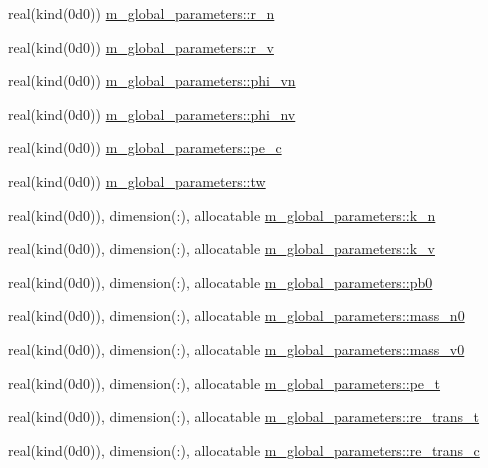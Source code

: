 \begin{Indent}
\begin{DoxyCompactItemize}
real(kind(0d0)) \hyperlink{namespacem__global__parameters_ae818e88601b1dc579a87e7c0c8cd87cb}{m\+\_\+global\+\_\+parameters\+::r\+\_\+n}
\item 
real(kind(0d0)) \hyperlink{namespacem__global__parameters_af2ee1ad578115833bb6b8e9550eb5f18}{m\+\_\+global\+\_\+parameters\+::r\+\_\+v}
\item 
real(kind(0d0)) \hyperlink{namespacem__global__parameters_acc6771df62005731bbec282b0c9a5659}{m\+\_\+global\+\_\+parameters\+::phi\+\_\+vn}
\item 
real(kind(0d0)) \hyperlink{namespacem__global__parameters_a7dbd1ec1fd1ece4e997a825fa07785eb}{m\+\_\+global\+\_\+parameters\+::phi\+\_\+nv}
\item 
real(kind(0d0)) \hyperlink{namespacem__global__parameters_ac1375e5145e018847d9025e83e58b49d}{m\+\_\+global\+\_\+parameters\+::pe\+\_\+c}
\item 
real(kind(0d0)) \hyperlink{namespacem__global__parameters_aa77b0836fe22478b69e10e656ef7fcc2}{m\+\_\+global\+\_\+parameters\+::tw}
\item 
real(kind(0d0)), dimension(\+:), allocatable \hyperlink{namespacem__global__parameters_a555eda1318a218d37d1bdd8f4d57eaf2}{m\+\_\+global\+\_\+parameters\+::k\+\_\+n}
\item 
real(kind(0d0)), dimension(\+:), allocatable \hyperlink{namespacem__global__parameters_a1943ea5a5127e94a197afae57be95758}{m\+\_\+global\+\_\+parameters\+::k\+\_\+v}
\item 
real(kind(0d0)), dimension(\+:), allocatable \hyperlink{namespacem__global__parameters_a1097b95561b65a9035e5f9218de577f9}{m\+\_\+global\+\_\+parameters\+::pb0}
\item 
real(kind(0d0)), dimension(\+:), allocatable \hyperlink{namespacem__global__parameters_ae3701f74c9487c9e56c2a11fb6a52e40}{m\+\_\+global\+\_\+parameters\+::mass\+\_\+n0}
\item 
real(kind(0d0)), dimension(\+:), allocatable \hyperlink{namespacem__global__parameters_a6a06981be6cdab78452a106009022aa4}{m\+\_\+global\+\_\+parameters\+::mass\+\_\+v0}
\item 
real(kind(0d0)), dimension(\+:), allocatable \hyperlink{namespacem__global__parameters_a8a75928178eef1550c6a0389ff12b44a}{m\+\_\+global\+\_\+parameters\+::pe\+\_\+t}
\item 
real(kind(0d0)), dimension(\+:), allocatable \hyperlink{namespacem__global__parameters_ae0e61a10cd5b33db394052fbefee2681}{m\+\_\+global\+\_\+parameters\+::re\+\_\+trans\+\_\+t}
\item 
real(kind(0d0)), dimension(\+:), allocatable \hyperlink{namespacem__global__parameters_a666c8f5f6663ab81f55c2298e642a3a9}{m\+\_\+global\+\_\+parameters\+::re\+\_\+trans\+\_\+c}

\end{DoxyCompactItemize}
\end{Indent}
